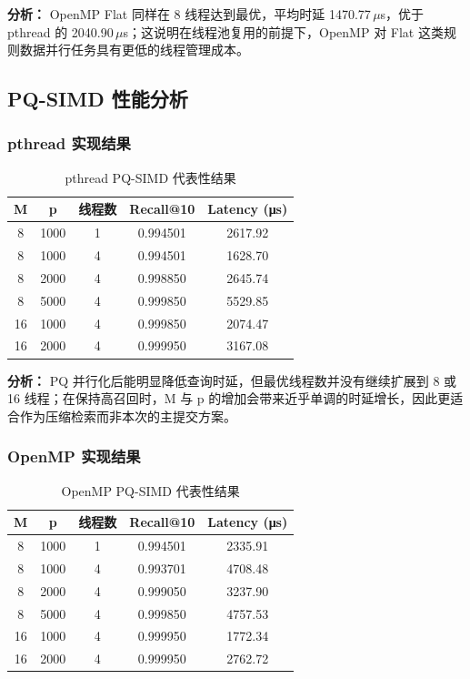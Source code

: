 \documentclass[a4paper]{article}
\begin{document}
\textbf{分析：} OpenMP Flat 同样在 8 线程达到最优，平均时延 1470.77\,$\mu$s，优于 pthread 的 2040.90\,$\mu$s；这说明在线程池复用的前提下，OpenMP 对 Flat 这类规则数据并行任务具有更低的线程管理成本。

\subsection{PQ-SIMD 性能分析}

\subsubsection{pthread 实现结果}

\begin{table}[htbp]
\centering
\caption{pthread PQ-SIMD 代表性结果}
\begin{tabular}{ccccc}
\toprule
M & p & 线程数 & Recall@10 & Latency (μs) \\
\midrule
8 & 1000 & 1 & 0.994501 & 2617.92 \\
8 & 1000 & 4 & 0.994501 & 1628.70 \\
8 & 2000 & 4 & 0.998850 & 2645.74 \\
8 & 5000 & 4 & 0.999850 & 5529.85 \\
16 & 1000 & 4 & 0.999850 & 2074.47 \\
16 & 2000 & 4 & 0.999950 & 3167.08 \\
\bottomrule
\end{tabular}
\end{table}

\textbf{分析：} PQ 并行化后能明显降低查询时延，但最优线程数并没有继续扩展到 8 或 16 线程；在保持高召回时，M 与 p 的增加会带来近乎单调的时延增长，因此更适合作为压缩检索而非本次的主提交方案。

\subsubsection{OpenMP 实现结果}

\begin{table}[htbp]
\centering
\caption{OpenMP PQ-SIMD 代表性结果}
\begin{tabular}{ccccc}
\toprule
M & p & 线程数 & Recall@10 & Latency (μs) \\
\midrule
8 & 1000 & 1 & 0.994501 & 2335.91 \\
8 & 1000 & 4 & 0.993701 & 4708.48 \\
8 & 2000 & 4 & 0.999050 & 3237.90 \\
8 & 5000 & 4 & 0.999850 & 4757.53 \\
16 & 1000 & 4 & 0.999950 & 1772.34 \\
16 & 2000 & 4 & 0.999950 & 2762.72 \\
\bottomrule
\end{tabular}
\end{table}
\end{document}

